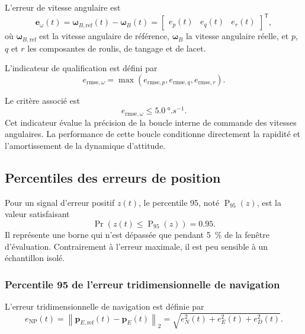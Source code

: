\documentclass[11pt,a4paper,oneside]{report}
\newcommand{\vect}[1]{\bm{#1}}
\newcommand{\trans}{^{\mathsf T}}
\newcommand{\norm}[1]{\left\lVert#1\right\rVert}
\begin{document}
L'erreur de vitesse angulaire est
\begin{equation}
	\vect e_\omega(t)
	=
	\vect\omega_{B,\mathrm{ref}}(t)-\vect\omega_B(t)
	=
	\begin{bmatrix}
		e_p(t) & e_q(t) & e_r(t)
	\end{bmatrix}\trans,
	\label{eq_body_rate_tracking_error}
\end{equation}
où $\vect\omega_{B,\mathrm{ref}}$ est la vitesse angulaire de référence, $\vect\omega_B$ la vitesse angulaire réelle, et $p$, $q$ et $r$ les composantes de roulis, de tangage et de lacet.

L'indicateur de qualification est défini par
\begin{equation}
	e_{\mathrm{rmse},\omega}
	=
	\max\left(
	e_{\mathrm{rmse},p},
	e_{\mathrm{rmse},q},
	e_{\mathrm{rmse},r}
	\right).
	\label{eq_body_rate_max_rmse}
\end{equation}

Le critère associé est
\begin{equation}
	e_{\mathrm{rmse},\omega}
	\leq
	\SI{5.0}{\degree.s^{-1}}.
	\label{eq_body_rate_rmse_requirement}
\end{equation}
Cet indicateur évalue la précision de la boucle interne de commande des vitesses angulaires. La performance de cette boucle conditionne directement la rapidité et l'amortissement de la dynamique d'attitude.

\subsection{Percentiles des erreurs de position}

Pour un signal d'erreur positif $z(t)$, le percentile 95, noté $\operatorname{P}_{95}(z)$, est la valeur satisfaisant
\begin{equation}
	\Pr\!\left(
	z(t)\leq\operatorname{P}_{95}(z)
	\right)=0.95.
	\label{eq_percentile_95_definition}
\end{equation}
Il représente une borne qui n'est dépassée que pendant \SI{5}{\percent} de la fenêtre d'évaluation. Contrairement à l'erreur maximale, il est peu sensible à un échantillon isolé.

\subsubsection{Percentile 95 de l'erreur tridimensionnelle de navigation}

L'erreur tridimensionnelle de navigation est définie par
\begin{equation}
	e_{\mathrm{NP}}(t)
	=
	\norm{
		\vect p_{E,\mathrm{ref}}(t)-\vect p_E(t)
	}_2
	=
	\sqrt{
		e_N^2(t)+e_E^2(t)+e_D^2(t)
	}.
	\label{eq_navigation_3d_error}
\end{equation}
\end{document}
